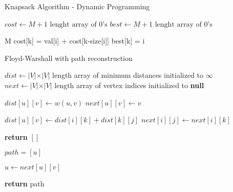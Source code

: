 \documentclass{article}
\begin{document}
\begin{algorithm}[h]
\caption{Knapsack Algorithm - Dynamic Programming}
\begin{algorithmic}[1]


\State $cost \gets M + 1 \text{ lenght array of 0's}$
\State $best \gets M + 1 \text{ lenght array of 0's}$

 {M}
			\State cost[k] = val[i] + cost[k-size[i]]
			\State best[k] = i
		\EndIf
	\EndFor
\EndFor
\EndProcedure

\end{algorithmic}
\end{algorithm}

\begin{algorithm}[h]
\caption{Floyd-Warshall with path reconstruction}
\begin{algorithmic}[1]

\State $dist \gets  \vert V \vert \times \vert V \vert$ length array of minimum distances initialized to $\infty$
\State $next \gets \vert V \vert \times \vert V \vert$ length array of vertex indices initialized to \textbf{null}


	\State $dist[u][v] \gets w(u, v)$
	\State $next[u][v] \gets v$
\EndFor

				\State $dist[u][v] \gets dist[i][k] + dist[k][j]$
				\State $next[i][j] \gets next[i][k]$
			\EndIf
		\EndFor
	\EndFor
\EndFor

\EndProcedure


	\State \textbf{return} $[]$
\EndIf

\State $path = [u]$

	\State $u \gets next[u][v]$
	\State {}
\EndWhile

\State \textbf{return} path

\EndProcedure

\end{algorithmic}
\end{algorithm}
\end{document}

